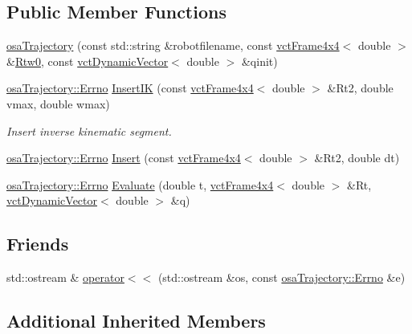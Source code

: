 \subsection*{Public Member Functions}
\begin{DoxyCompactItemize}
\item 
\hyperlink{classosa_trajectory_a1011e0e231922d9130e3e4509aac0cd3}{osa\+Trajectory} (const std\+::string \&robotfilename, const \hyperlink{classvct_frame4x4}{vct\+Frame4x4}$<$ double $>$ \&\hyperlink{classrob_manipulator_ab48d9d9a166bf252698bc35788ca6ad6}{Rtw0}, const \hyperlink{classvct_dynamic_vector}{vct\+Dynamic\+Vector}$<$ double $>$ \&qinit)
\item 
\hyperlink{classosa_trajectory_a9d6482436bb2b9a6c0513e2811ab79fc}{osa\+Trajectory\+::\+Errno} \hyperlink{classosa_trajectory_a91223c5d624edcfece34264e985d77de}{Insert\+I\+K} (const \hyperlink{classvct_frame4x4}{vct\+Frame4x4}$<$ double $>$ \&Rt2, double vmax, double wmax)
\begin{DoxyCompactList}\small\item\em Insert inverse kinematic segment. \end{DoxyCompactList}\item 
\hyperlink{classosa_trajectory_a9d6482436bb2b9a6c0513e2811ab79fc}{osa\+Trajectory\+::\+Errno} \hyperlink{classosa_trajectory_a8b65a6dee146d10af024d26ca9f5a46d}{Insert} (const \hyperlink{classvct_frame4x4}{vct\+Frame4x4}$<$ double $>$ \&Rt2, double dt)
\item 
\hyperlink{classosa_trajectory_a9d6482436bb2b9a6c0513e2811ab79fc}{osa\+Trajectory\+::\+Errno} \hyperlink{classosa_trajectory_a70df95503cc650ccfc671f076989b053}{Evaluate} (double t, \hyperlink{classvct_frame4x4}{vct\+Frame4x4}$<$ double $>$ \&Rt, \hyperlink{classvct_dynamic_vector}{vct\+Dynamic\+Vector}$<$ double $>$ \&q)
\end{DoxyCompactItemize}
\subsection*{Friends}
\begin{DoxyCompactItemize}
\item 
std\+::ostream \& \hyperlink{classosa_trajectory_a6b3f1ffdb01d90f1cc08e5ebc8ef6bdf}{operator$<$$<$} (std\+::ostream \&os, const \hyperlink{classosa_trajectory_a9d6482436bb2b9a6c0513e2811ab79fc}{osa\+Trajectory\+::\+Errno} \&e)
\end{DoxyCompactItemize}
\subsection*{Additional Inherited Members}



